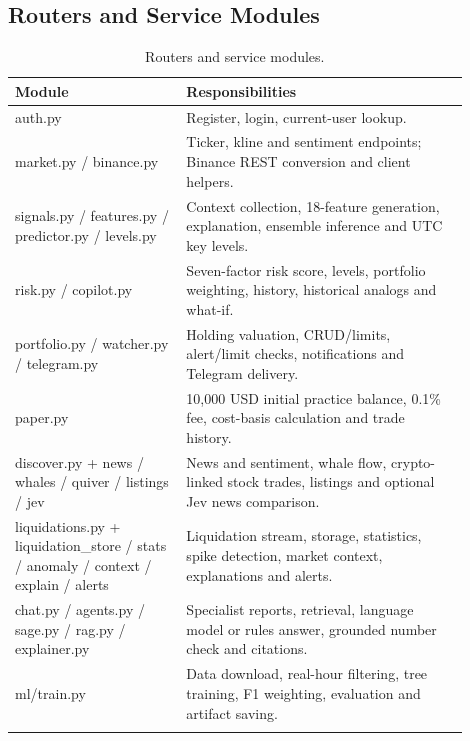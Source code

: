\subsection{Routers and Service Modules}
{\renewcommand{\arraystretch}{1.3}
\begin{longtable}{|p{0.34\linewidth}|p{0.56\linewidth}|}
\hline\textbf{Module} & \textbf{Responsibilities}\\\hline\endhead
auth.py & Register, login, current-user lookup.\\\hline
market.py / binance.py & Ticker, kline and sentiment endpoints; Binance REST conversion and client helpers.\\\hline
signals.py / features.py / predictor.py / levels.py & Context collection, 18-feature generation, explanation, ensemble inference and UTC key levels.\\\hline
risk.py / copilot.py & Seven-factor risk score, levels, portfolio weighting, history, historical analogs and what-if.\\\hline
portfolio.py / watcher.py / telegram.py & Holding valuation, CRUD/limits, alert/limit checks, notifications and Telegram delivery.\\\hline
paper.py & 10{,}000 USD initial practice balance, 0.1\% fee, cost-basis calculation and trade history.\\\hline
discover.py + news / whales / quiver / listings / jev & News and sentiment, whale flow, crypto-linked stock trades, listings and optional Jev news comparison.\\\hline
liquidations.py + liquidation\_store / stats / anomaly / context / explain / alerts & Liquidation stream, storage, statistics, spike detection, market context, explanations and alerts.\\\hline
chat.py / agents.py / sage.py / rag.py / explainer.py & Specialist reports, retrieval, language model or rules answer, grounded number check and citations.\\\hline
ml/train.py & Data download, real-hour filtering, tree training, F1 weighting, evaluation and artifact saving.\\\hline
\caption{Routers and service modules.}\label{tab:modules}
\end{longtable}}

